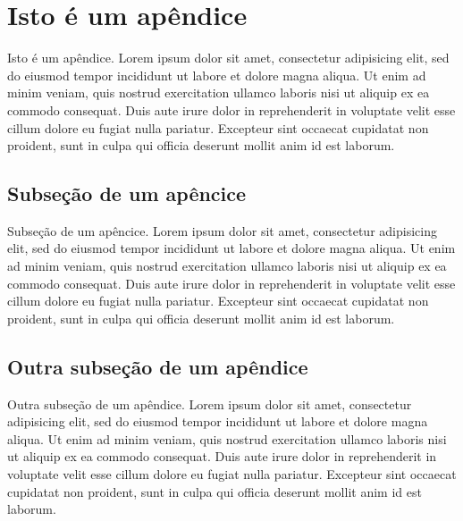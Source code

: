 \chapter{Isto é um apêndice}

Isto é um apêndice.  Lorem ipsum dolor sit amet, consectetur adipisicing elit,
sed do eiusmod tempor incididunt ut labore et dolore magna aliqua. Ut enim ad
minim veniam, quis nostrud exercitation ullamco laboris nisi ut aliquip ex ea
commodo consequat.  Duis aute irure dolor in reprehenderit in voluptate velit
esse cillum dolore eu fugiat nulla pariatur. Excepteur sint occaecat cupidatat
non proident, sunt in culpa qui officia deserunt mollit anim id est laborum.

\section{Subseção de um apêncice}

Subseção de um apêncice. Lorem ipsum dolor sit amet, consectetur adipisicing
elit, sed do eiusmod tempor incididunt ut labore et dolore magna aliqua. Ut
enim ad minim veniam, quis nostrud exercitation ullamco laboris nisi ut aliquip
ex ea commodo consequat.  Duis aute irure dolor in reprehenderit in voluptate
velit esse cillum dolore eu fugiat nulla pariatur. Excepteur sint occaecat
cupidatat non proident, sunt in culpa qui officia deserunt mollit anim id est
laborum.


\section{Outra subseção de um apêndice}

Outra subseção de um apêndice.  Lorem ipsum dolor sit amet, consectetur
adipisicing elit, sed do eiusmod tempor incididunt ut labore et dolore magna
aliqua. Ut enim ad minim veniam, quis nostrud exercitation ullamco laboris nisi
ut aliquip ex ea commodo consequat.  Duis aute irure dolor in reprehenderit in
voluptate velit esse cillum dolore eu fugiat nulla pariatur. Excepteur sint
occaecat cupidatat non proident, sunt in culpa qui officia deserunt mollit anim
id est laborum.


